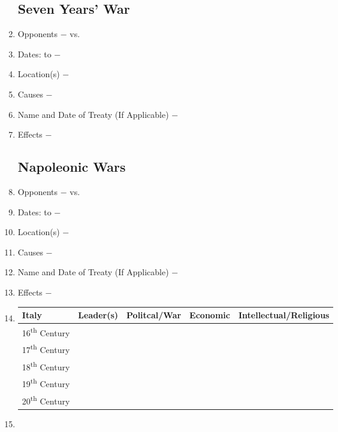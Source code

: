 \documentclass[12pt]{article}
\begin{document}
\begin{enumerate}
\subsection{Seven Years' War}

\item Opponents $-$ vs.

\item Dates: to $-$

\item Location(s) $-$ 

\item Causes $-$

\item Name and Date of Treaty (If Applicable) $-$ 

\item Effects $-$

\subsection{Napoleonic Wars} 

\item Opponents $-$ vs.

\item Dates: to $-$

\item Location(s) $-$ 

\item Causes $-$

\item Name and Date of Treaty (If Applicable) $-$ 

\item Effects $-$ 

\item \begin{tabular}{l c c c c}

Italy & Leader(s) & Politcal/War & Economic & Intellectual/Religious \\
\hline
16\textsuperscript{th} Century & & & & \\
\hline
17\textsuperscript{th} Century & & & & \\
\hline
18\textsuperscript{th} Century & & & & \\
\hline
19\textsuperscript{th} Century & & & & \\
\hline
20\textsuperscript{th} Century & & & & \\

\end{tabular}

\item \begin{tabular}{l c c c c}


\end{tabular}
\end{enumerate}
\end{document}
